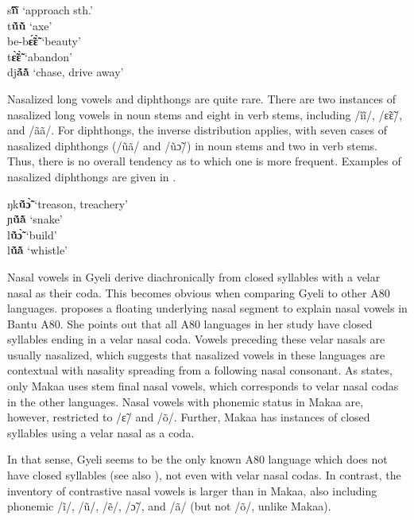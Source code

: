 \newpage
\ea \label{NasalV3}
s{\bfseries ĩ́ĩ̀} `approach sth.' \\
t{\bfseries ṹũ̀} `axe' \\
be-b{\bfseries ɛ̃́ɛ̃̀} `beauty' \\
t{\bfseries ɛ̃̀ɛ̃̀} `abandon' \\
dj{\bfseries ã́ã̀} `chase, drive away'
\z

\noindent Nasalized long vowels and diphthongs are quite rare. There are two instances of nasalized long vowels in noun stems and eight in verb stems, including /ĩĩ/, /ɛ̃ɛ̃/, and /ãã/. For diphthongs, the inverse distribution applies, with seven cases of nasalized diphthongs (/ũã/ and /ũɔ̃/) in noun stems and two in verb stems. Thus, there is no overall tendency as to which one is more frequent. Examples of nasalized diphthongs are given in .

\ea \label{NasalV4}
ŋk{\bfseries ṹɔ̃̀} `treason, treachery' \\
ɲ{\bfseries ṹã̀} `snake' \\
l{\bfseries ṹɔ̃̀} `build' \\
l{\bfseries ṹã̀} `whistle'
\z

Nasal vowels in Gyeli derive diachronically from closed syllables with a velar nasal as their coda. This becomes obvious when comparing Gyeli to other A80 languages. \citet[329]{cheucle2014} proposes a floating underlying nasal segment to explain nasal vowels in Bantu A80. She points out that all A80 languages in her study have closed syllables ending in a velar nasal coda. Vowels preceding these velar nasals are usually nasalized, which suggests that nasalized vowels in these languages are contextual with nasality spreading from a following nasal consonant. As \citet[329]{cheucle2014} states,  only Makaa uses stem final nasal vowels, which corresponds to velar nasal codas in the other languages. Nasal vowels with phonemic status in Makaa are, however, restricted to /ɛ̃/ and /õ/. Further, Makaa has instances of closed syllables using a velar nasal as a coda.

In that sense, Gyeli seems to be the only known A80 language which does not have closed syllables (see also ), not even with velar nasal codas. In contrast, the inventory of contrastive nasal vowels is larger than in Makaa, also including phonemic /ĩ/, /ũ/, /ẽ/, /ɔ̃/, and /ã/ (but not /õ/, unlike Makaa).








